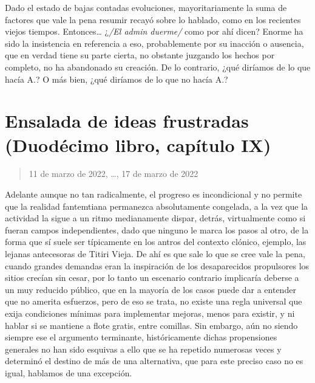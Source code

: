 \documentclass[
]{book}
\begin{document}
Dado el estado de bajas contadas evoluciones, mayoritariamente la suma de factores que vale la pena resumir recayó sobre lo hablado, como en los recientes viejos tiempos. Entonces\ldots{} ¿\emph{/El admin duerme/} como por ahí dicen? Enorme ha sido la insistencia en referencia a eso, probablemente por su inacción o ausencia, que en verdad tiene su parte cierta, no obstante juzgando los hechos por completo, no ha abandonado su creación. De lo contrario, ¿qué diríamos de lo que hacía A.? O más bien, ¿qué diríamos de lo que no hacía A.?

\hypertarget{ensalada-de-ideas-frustradas-duoduxe9cimo-libro-capuxedtulo-ix}{%
\section{Ensalada de ideas frustradas (Duodécimo libro, capítulo IX)}\label{ensalada-de-ideas-frustradas-duoduxe9cimo-libro-capuxedtulo-ix}}

\begin{quote}
11 de marzo de 2022, \ldots, 17 de marzo de 2022
\end{quote}

Adelante aunque no tan radicalmente, el progreso es incondicional y no permite que la realidad fantemtiana permanezca absolutamente congelada, a la vez que la actividad la sigue a un ritmo medianamente dispar, detrás, virtualmente como si fueran campos independientes, dado que ninguno le marca los pasos al otro, de la forma que sí suele ser típicamente en los antros del contexto clónico, ejemplo, las lejanas antecesoras de Titiri Vieja. De ahí es que sale lo que se cree vale la pena, cuando grandes demandas eran la inspiración de los desaparecidos propulsores los sitios crecían sin cesar, por lo tanto un escenario contrario implicaría deberse a un muy reducido público, que en la mayoría de los casos puede dar a entender que no amerita esfuerzos, pero de eso se trata, no existe una regla universal que exija condiciones mínimas para implementar mejoras, menos para existir, y ni hablar si se mantiene a flote gratis, entre comillas. Sin embargo, aún no siendo siempre ese el argumento terminante, históricamente dichas propensiones generales no han sido esquivas a ello que se ha repetido numerosas veces y determinó el destino de más de una alternativa, que para este preciso caso no es igual, hablamos de una excepción.
\end{document}
